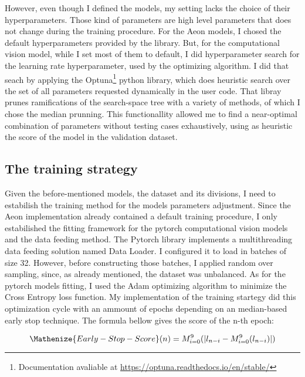 



However, even though I defined the models, my setting lacks the choice of their hyperparameters. Those kind of parameters are high level parameters that does not change during the training procedure. For the Aeon models, I chosed the default hyperparameters provided by the library. But, for the computational vision model, while I set most of them to default, I did hyperparameter search for the learning rate hyperparameter, used by the optimizing algorithm. I did that seach by applying the Optuna\footnote{Documentation avaliable at \url{https://optuna.readthedocs.io/en/stable/}} python library, which does heuristic search over the set of all parameters requested dynamically in the user code. That libray prunes ramifications of the search-space tree with a variety of methods, of which I chose the median prunning. This functionallity allowed me to find a near-optimal combination of parameters without testing cases exhaustively, using as heuristic the score of the model in the validation dataset.

\subsection{The training strategy}

Given the before-mentioned models, the dataset and its divisions, I need to estabilish the training method for the models parameters adjustment. Since the Aeon implementation already contained a default training procedure, I only estabilished the fitting framework for the pytorch computational vision models and the data feeding method. The Pytorch library implements a multithreading data feeding solution named Data Loader. I configured it to load in batches of size 32. However, before constructing those batches, I applied random over sampling, since, as already mentioned, the dataset was unbalanced. As for the pytorch models fitting, I used the Adam optimizing algorithm \cite{Adam} to minimize the Cross Entropy loss function. My implementation of the training startegy did this optimization cycle with an ammount of epochs depending on an median-based early stop technique. The formula bellow gives the score of the n-th epoch:

\begin{equation}
\Mathenize{Early-Stop-Score}(n) = M_{i=0}^{9}(|l_{n-i} - M_{i=0}^{9}(l_{n-i})|)
\end{equation}

